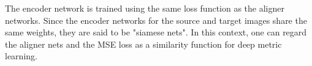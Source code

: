 \documentclass{article}
\begin{document}

The encoder network is trained using the same loss function as the aligner networks. Since the encoder networks for the source and target images share the same weights, they are said to be "siamese nets"\citep{chopra2005learning}. In this context, one can regard the aligner nets and the MSE loss as a similarity function for deep metric learning. 

\end{document}
